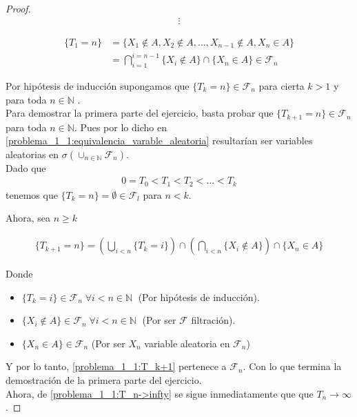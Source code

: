 \begin{proof}
	\begin{align}
		\vdots
	\end{align}
	
	\begin{align}
			\{T_1 = n\} 	&=	\{ X_1 \not\in A, X_2 \not\in A, \dots, X_{n-1} \not\in A, X_n \in A \} \\
							&= 	\bigcap_{i=1}^{i=n-1} \{ X_i \not\in A \} \cap \{X_n \in A \} \in \mathscr{F}_n
	\end{align} 
 
	Por hipótesis de inducción supongamos que $\{T_k = n\} \in \mathscr{F}_n$ para cierta $k>1$ 
	y para toda $n \in \mathbb{N}$ . \\

	Para demostrar la primera parte del ejercicio, basta probar que $\{T_{k+1} = n\} \in \mathscr{F}_n$ para 
	toda $n \in \mathbb{N}$. Pues por lo dicho en \eqref{problema_1_1:equivalencia_varable_aleatoria} resultarían ser 
	variables aleatorias en $\sigma(\cup_{n \in \mathbb{N}} \mathscr{F}_n)$.
	\\
	
	Dado que 
	\begin{align}\label{problema_1_1:T_n->infty}
		0=T_0<T_1<T_2<\dots<T_k
	\end{align}  
	tenemos que $\{ T_k = n\} = \emptyset \in \mathscr{F}_l$ para $n < k$. 
	
	Ahora, sea $n \geq k$
	
	\begin{align}\label{problema_1_1:T_k+1}
		\{ T_{k+1} = n\} = 
		\left( \bigcup_{i < n } \{T_k = i \} \right) 
		\cap 
		\left( \bigcap_{i < n} \{ X_i \not\in A \} \right)
		\cap
		\{ X_n \in A\}
	\end{align}
	
	
	Donde 
	\begin{itemize}
		\item	 $\{ T_k = i\} \in \mathscr{F}_n \; \forall i < n \in \mathbb{N} \; $ (Por hipótesis de inducción).	
		\item	 $\{ X_i \not \in A\} \in \mathscr{F}_n \; \forall i < n \in \mathbb{N} \;$ (Por ser $\mathscr{F}$ filtración).
		\item $\{ X_n \in A\} \in \mathscr{F}_n$ (Por ser $X_n$ variable aleatoria en $\mathscr{F}_n$)	
	\end{itemize}
	
	Y por lo tanto, \eqref{problema_1_1:T_k+1} pertenece a $\mathscr{F}_n$. Con lo que termina la demostración de la primera parte del ejercicio.\\
	
	Ahora, de \eqref{problema_1_1:T_n->infty} se sigue inmediatamente que que $T_n \rightarrow \infty$.
\end{proof}